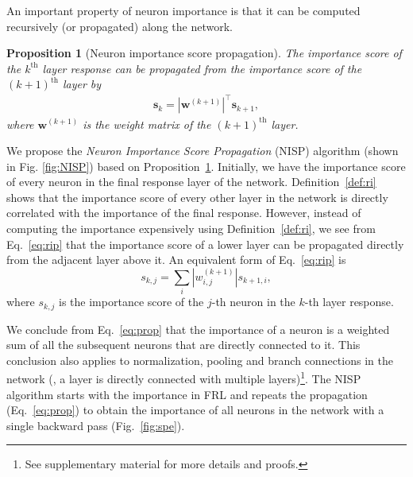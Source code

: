 \documentclass[10pt,twocolumn,letterpaper]{article}
\newtheorem{proposition}[theorem]{Proposition}
\def\mb{\mathbf}
\begin{document}
An important property of neuron importance is that it can be computed recursively (or propagated) along the network.
\begin{proposition}[Neuron importance score propagation] \label{def:rip} The importance score of the $k^\text{th}$ layer response can be propagated from the importance score of the $(k+1)^\text{th}$ layer by
\begin{align}
\mb s_k=|\mb w^{(k+1)}|^\intercal\mb s_{k+1},\label{eq:rip}
\end{align}
where $\mb w^{(k+1)}$ is the weight matrix of the $(k+1)^\text{th}$ layer.
\end{proposition}%
We propose the \textit{Neuron Importance Score Propagation} (NISP) algorithm (shown in Fig. \ref{fig:NISP}) based on Proposition~\ref{def:rip}. Initially, we have the importance score of every neuron in the final response layer of the network. Definition~\ref{def:ri} shows that the importance score of every other layer in the network is directly correlated with the importance of the final response. However, instead of computing the importance expensively using Definition~\ref{def:ri}, we see from Eq.~\ref{eq:rip} that the importance score of a lower layer can be propagated directly from the adjacent layer above it. An equivalent form of Eq.~\ref{eq:rip} is
\begin{equation}
    \textstyle s_{k,j}=\sum_i |w^{(k+1)}_{i,j}|s_{k+1,i},\label{eq:prop}
\end{equation}
where $s_{k,j}$ is the importance score of the $j$-th neuron in the $k$-th layer response. 

We conclude from Eq.~\ref{eq:prop} that the importance of a neuron is a weighted sum of all the subsequent neurons that are directly connected to it. This conclusion also applies to normalization, pooling and branch connections in the network (\ie, a layer is directly connected with multiple layers)\footnote{\label{supp}See supplementary material for more details and proofs.}. The NISP algorithm starts with the importance in FRL and repeats the propagation (Eq.~\ref{eq:prop}) to obtain the importance of all neurons in the network with a single backward pass (Fig.~\ref{fig:spe}).
\end{document}
